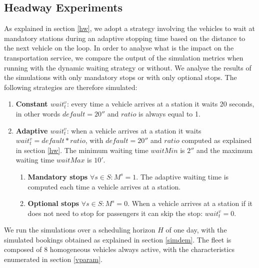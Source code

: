 \documentclass[12pt,a4paper]{article}
\begin{document}
\subsection{Headway Experiments}\label{hwexperiments}
As explained in section \ref{hw}, we adopt a strategy involving the vehicles to wait at mandatory stations during an adaptive stopping time based on the distance to the next vehicle on the loop. In order to analyse what is the impact on the transportation service, we compare the output of the simulation metrics when running with the dynamic waiting strategy or without. We analyse the results of the simulations with only mandatory stops or with only optional stops. The following strategies are therefore simulated:
\begin{enumerate}
\setlength\itemsep{1pt}
\item \textbf{Constant $wait_t^{v}$}: every time a vehicle arrives at a station it waits 20 seconds, in other words $default= 20''$ and $ratio$ is always equal to 1. 
\item \textbf{Adaptive $wait_t^{v}$}: when a vehicle arrives at a station it waits $wait_t^{v} = default * ratio$, with $default = 20''$ and $ratio$ computed as explained in section \ref{hw}. The minimum waiting time $waitMin$ is $2''$ and the maximum waiting time $waitMax$ is $10'$.
\begin{enumerate}
\item \textbf{Mandatory stops} $\forall s \in S: M^{s} = 1$. The adaptive waiting time is computed each time a vehicle arrives at a station.
\item \textbf{Optional stops} $\forall s \in S: M^{s} = 0$. When a vehicle arrives at a station if it does not need to stop for passengers it can skip the stop: $wait_t^{v} = 0$.
\end{enumerate}
\end{enumerate}
We run the simulations over a scheduling horizon $H$ of one day, with the simulated bookings obtained as explained in section \ref{simdem}. The fleet is composed of 8 homogeneous vehicles always active, with the characteristics enumerated in section \ref{vparam}. 
\end{document}
